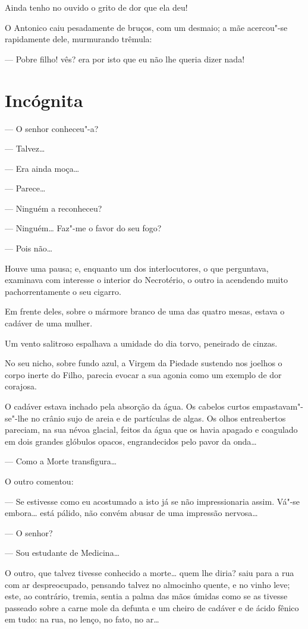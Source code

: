 Ainda tenho no ouvido o grito de dor que ela deu!

O Antonico caiu pesadamente de bruços, com um desmaio; a mãe acercou"-se
rapidamente dele, murmurando trêmula:

--- Pobre filho! vês? era por isto que eu não lhe queria dizer nada!

\chapter{Incógnita}

--- O senhor conheceu"-a?

--- Talvez\ldots{}

--- Era ainda moça\ldots{}

--- Parece\ldots{}

--- Ninguém a reconheceu?

--- Ninguém\ldots{} Faz"-me o favor do seu fogo?

--- Pois não\ldots{}

Houve uma pausa; e, enquanto um dos interlocutores, o que perguntava,
examinava com interesse o interior do Necrotério, o outro ia acendendo
muito pachorrentamente o seu cigarro.

Em frente deles, sobre o mármore branco de uma das quatro mesas, estava
o cadáver de uma mulher.

Um vento salitroso espalhava a umidade do dia torvo, peneirado de
cinzas.

No seu nicho, sobre fundo azul, a Virgem da Piedade sustendo nos joelhos
o corpo inerte do Filho, parecia evocar a sua agonia como um exemplo de
dor corajosa.

O cadáver estava inchado pela absorção da água. Os cabelos curtos
empastavam"-se"-lhe no crânio sujo de areia e de partículas de algas. Os
olhos entreabertos pareciam, na sua névoa glacial, feitos da água que os
havia apagado e coagulado em dois grandes glóbulos opacos, engrandecidos
pelo pavor da onda\ldots{}

--- Como a Morte transfigura\ldots{}

O outro comentou:

--- Se estivesse como eu acostumado a isto já se não impressionaria
assim. Vá"-se embora\ldots{} está pálido, não convém abusar de uma impressão
nervosa\ldots{}

--- O senhor?

--- Sou estudante de Medicina\ldots{}

O outro, que talvez tivesse conhecido a morte\ldots{} quem lhe diria? saiu
para a rua com ar despreocupado, pensando talvez no almocinho quente, e
no vinho leve; este, ao contrário, tremia, sentia a palma das mãos
úmidas como se as tivesse passeado sobre a carne mole da defunta e um
cheiro de cadáver e de ácido fênico em tudo: na rua, no lenço, no fato,
no ar\ldots{}

